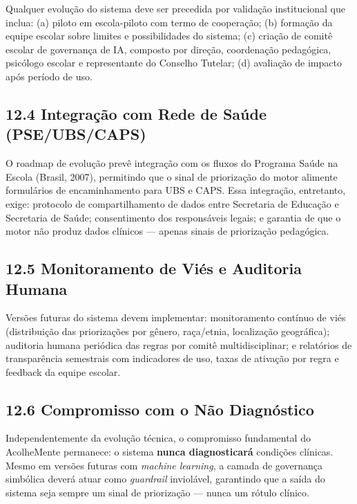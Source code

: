 \documentclass[11pt]{article}
\begin{document}
Qualquer evolução do sistema deve ser precedida por validação
institucional que inclua: (a) piloto em escola-piloto com termo de
cooperação; (b) formação da equipe escolar sobre limites e
possibilidades do sistema; (c) criação de comitê escolar de governança
de IA, composto por direção, coordenação pedagógica, psicólogo escolar e
representante do Conselho Tutelar; (d) avaliação de impacto após período
de uso.

\subsection{12.4 Integração com Rede de Saúde
(PSE/UBS/CAPS)}\label{integrauxe7uxe3o-com-rede-de-sauxfade-pseubscaps}

O roadmap de evolução prevê integração com os fluxos do Programa Saúde
na Escola (Brasil, 2007), permitindo que o sinal de priorização do motor
alimente formulários de encaminhamento para UBS e CAPS. Essa integração,
entretanto, exige: protocolo de compartilhamento de dados entre
Secretaria de Educação e Secretaria de Saúde; consentimento dos
responsáveis legais; e garantia de que o motor não produz dados clínicos
--- apenas sinais de priorização pedagógica.

\subsection{12.5 Monitoramento de Viés e Auditoria
Humana}\label{monitoramento-de-viuxe9s-e-auditoria-humana}

Versões futuras do sistema devem implementar: monitoramento contínuo de
viés (distribuição das priorizações por gênero, raça/etnia, localização
geográfica); auditoria humana periódica das regras por comitê
multidisciplinar; e relatórios de transparência semestrais com
indicadores de uso, taxas de ativação por regra e feedback da equipe
escolar.

\subsection{12.6 Compromisso com o Não
Diagnóstico}\label{compromisso-com-o-nuxe3o-diagnuxf3stico}

Independentemente da evolução técnica, o compromisso fundamental do
AcolheMente permanece: o sistema \textbf{nunca diagnosticará} condições
clínicas. Mesmo em versões futuras com \emph{machine learning}, a camada
de governança simbólica deverá atuar como \emph{guardrail} inviolável,
garantindo que a saída do sistema seja sempre um sinal de priorização
--- nunca um rótulo clínico.
\end{document}
